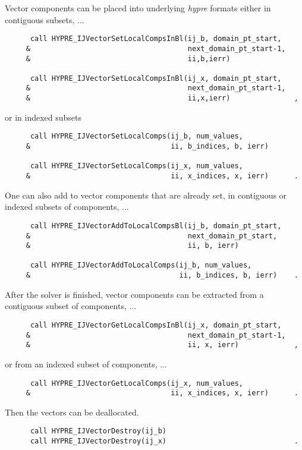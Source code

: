 \noindent Vector components can be placed into underlying {\slshape hypre}
formats either in contiguous subsets, ...

\begin{verbatim}
      call HYPRE_IJVectorSetLocalCompsInBl(ij_b, domain_pt_start,
     &                                     next_domain_pt_start-1,
     &                                     ii,b,ierr)

      call HYPRE_IJVectorSetLocalCompsInBl(ij_x, domain_pt_start,
     &                                     next_domain_pt_start-1,
     &                                     ii,x,ierr)               ,
\end{verbatim}

\noindent or in indexed subsets

\begin{verbatim}
      call HYPRE_IJVectorSetLocalComps(ij_b, num_values,
     &                                 ii, b_indices, b, ierr)

      call HYPRE_IJVectorSetLocalComps(ij_x, num_values,
     &                                 ii, x_indices, x, ierr)      .
\end{verbatim}

\noindent One can also add to vector components that are already set, in
contiguous or indexed subsets of components, ...

\begin{verbatim}
      call HYPRE_IJVectorAddToLocalCompsBl(ij_b, domain_pt_start,
     &                                     next_domain_pt_start,
     &                                     ii, b, ierr) 

      call HYPRE_IJVectorAddToLocalComps(ij_b, num_values,
     &                                   ii, b_indices, b, ierr)    .
\end{verbatim}

\noindent After the solver is finished, vector components can be
extracted from a contiguous subset of components, ...

\begin{verbatim}
      call HYPRE_IJVectorGetLocalCompsInBl(ij_x, domain_pt_start,
     &                                     next_domain_pt_start-1,
     &                                     ii, x, ierr)             ,
\end{verbatim}

\noindent or from an indexed subset of components, ...

\begin{verbatim}
      call HYPRE_IJVectorGetLocalComps(ij_x, num_values,
     &                                 ii, x_indices, x, ierr)      .
\end{verbatim}

Then the vectors can be deallocated.

\begin{verbatim}
      call HYPRE_IJVectorDestroy(ij_b)
      call HYPRE_IJVectorDestroy(ij_x)                              .
\end{verbatim}



